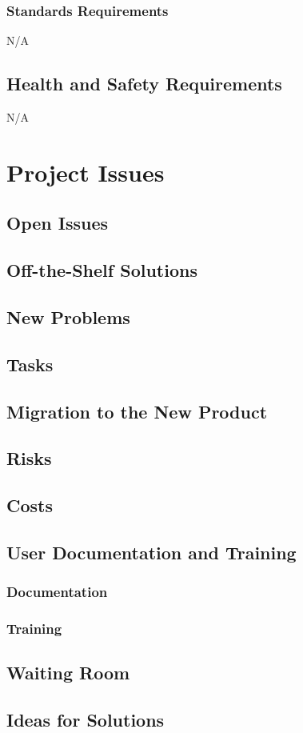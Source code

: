 \documentclass{article}
\begin{document}
    \subsubsection{Standards Requirements} 
    N/A
\subsection{Health and Safety Requirements}
    N/A
\section{Project Issues}
\subsection{Open Issues}
\subsection{Off-the-Shelf Solutions}
\subsection{New Problems}
\subsection{Tasks}
\subsection{Migration to the New Product}
\subsection{Risks}
\subsection{Costs}
\subsection{User Documentation and Training}
\subsubsection{Documentation}
\subsubsection{Training}
\subsection{Waiting Room}
\subsection{Ideas for Solutions}
\end{document}
